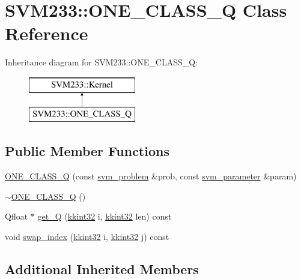 \hypertarget{class_s_v_m233_1_1_o_n_e___c_l_a_s_s___q}{}\section{S\+V\+M233\+:\+:O\+N\+E\+\_\+\+C\+L\+A\+S\+S\+\_\+Q Class Reference}
\label{class_s_v_m233_1_1_o_n_e___c_l_a_s_s___q}
Inheritance diagram for S\+V\+M233\+:\+:O\+N\+E\+\_\+\+C\+L\+A\+S\+S\+\_\+Q\+:\begin{figure}[H]
\begin{center}
\leavevmode
\includegraphics[height=2.000000cm]{class_s_v_m233_1_1_o_n_e___c_l_a_s_s___q}
\end{center}
\end{figure}
\subsection*{Public Member Functions}
\begin{DoxyCompactItemize}
\item 
\hyperlink{class_s_v_m233_1_1_o_n_e___c_l_a_s_s___q_a0cf803bdeba0051b18393b6f965a4b56}{O\+N\+E\+\_\+\+C\+L\+A\+S\+S\+\_\+Q} (const \hyperlink{struct_s_v_m233_1_1svm__problem}{svm\+\_\+problem} \&prob, const \hyperlink{struct_s_v_m233_1_1svm__parameter}{svm\+\_\+parameter} \&param)
\item 
\hyperlink{class_s_v_m233_1_1_o_n_e___c_l_a_s_s___q_a250f8e295c08e55aeee6ecd76f77c76d}{$\sim$\+O\+N\+E\+\_\+\+C\+L\+A\+S\+S\+\_\+Q} ()
\item 
Qfloat $\ast$ \hyperlink{class_s_v_m233_1_1_o_n_e___c_l_a_s_s___q_adfd647edbea411754a6f2b52624c0b0a}{get\+\_\+Q} (\hyperlink{namespace_k_k_b_a8fa4952cc84fda1de4bec1fbdd8d5b1b}{kkint32} i, \hyperlink{namespace_k_k_b_a8fa4952cc84fda1de4bec1fbdd8d5b1b}{kkint32} len) const 
\item 
void \hyperlink{class_s_v_m233_1_1_o_n_e___c_l_a_s_s___q_a0ffd217c65b8e98955f63c94137a82f0}{swap\+\_\+index} (\hyperlink{namespace_k_k_b_a8fa4952cc84fda1de4bec1fbdd8d5b1b}{kkint32} i, \hyperlink{namespace_k_k_b_a8fa4952cc84fda1de4bec1fbdd8d5b1b}{kkint32} j) const 
\end{DoxyCompactItemize}
\subsection*{Additional Inherited Members}


